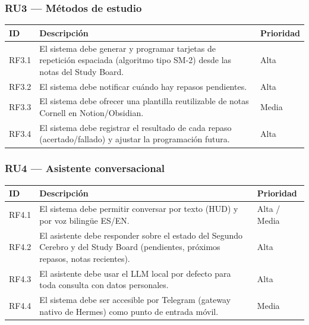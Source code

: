 \documentclass[11pt,a4paper]{article}
\begin{document}
\subsubsection*{RU3 --- Métodos de estudio}
\begin{longtable}{@{}p{1.5cm}p{11.2cm}p{1.7cm}@{}}
\toprule
ID & Descripción & Prioridad \\
\midrule
\endhead
RF3.1 & El sistema debe generar y programar tarjetas de repetición espaciada (algoritmo tipo SM-2) desde las notas del Study Board. & Alta \\
RF3.2 & El sistema debe notificar cuándo hay repasos pendientes. & Alta \\
RF3.3 & El sistema debe ofrecer una plantilla reutilizable de notas Cornell en Notion/Obsidian. & Media \\
RF3.4 & El sistema debe registrar el resultado de cada repaso (acertado/fallado) y ajustar la programación futura. & Alta \\
\bottomrule
\end{longtable}

\subsubsection*{RU4 --- Asistente conversacional}
\begin{longtable}{@{}p{1.5cm}p{11.2cm}p{1.7cm}@{}}
\toprule
ID & Descripción & Prioridad \\
\midrule
\endhead
RF4.1 & El sistema debe permitir conversar por texto (HUD) y por voz bilingüe ES/EN. & Alta / Media \\
RF4.2 & El asistente debe responder sobre el estado del Segundo Cerebro y del Study Board (pendientes, próximos repasos, notas recientes). & Alta \\
RF4.3 & El asistente debe usar el LLM local por defecto para toda consulta con datos personales. & Alta \\
RF4.4 & El sistema debe ser accesible por Telegram (gateway nativo de Hermes) como punto de entrada móvil. & Media \\
\bottomrule
\end{longtable}
\end{document}
